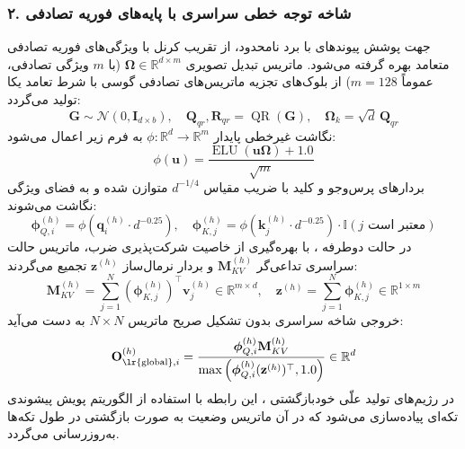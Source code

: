 \subsubsection*{۲. شاخه توجه خطی سراسری با پایه‌های فوریه تصادفی }
جهت پوشش پیوندهای با برد نامحدود، از تقریب کرنل با ویژگی‌های فوریه تصادفی متعامد  بهره گرفته می‌شود. ماتریس تبدیل تصویری $\boldsymbol{\Omega} \in \mathbb{R}^{d \times m}$ (با $m$ ویژگی تصادفی، عموماً $m=128$) از بلوک‌های تجزیه  ماتریس‌های تصادفی گوسی با شرط تعامد یکا تولید می‌گردد:
\begin{equation}
\mathbf{G} \sim \mathcal{N}(0, \mathbf{I}_{d \times b}), \quad \mathbf{Q}_{qr}, \mathbf{R}_{qr} = \operatorname{QR}(\mathbf{G}), \quad \boldsymbol{\Omega}_k = \sqrt{d} \, \mathbf{Q}_{qr}
\end{equation}
نگاشت غیرخطی پایدار $\phi: \mathbb{R}^d \to \mathbb{R}^m$ به فرم زیر اعمال می‌شود:
\begin{equation}
\phi(\mathbf{u}) = \frac{\operatorname{ELU}(\mathbf{u}\boldsymbol{\Omega}) + 1.0}{\sqrt{m}}
\end{equation}
بردارهای پرس‌وجو و کلید با ضریب مقیاس $d^{-1/4}$ متوازن شده و به فضای ویژگی نگاشت می‌شوند:
\begin{equation}
\boldsymbol{\phi}_{Q, i}^{(h)} = \phi(\mathbf{q}_i^{(h)} \cdot d^{-0.25}), \quad \boldsymbol{\phi}_{K, j}^{(h)} = \phi(\mathbf{k}_j^{(h)} \cdot d^{-0.25}) \cdot \mathbb{I}(j \text{ معتبر است})
\end{equation}
در حالت دوطرفه ، با بهره‌گیری از خاصیت شرکت‌پذیری ضرب، ماتریس حالت سراسری تداعی‌گر $\mathbf{M}_{KV}^{(h)}$ و بردار نرمال‌ساز $\mathbf{z}^{(h)}$ تجمیع می‌گردند:
\begin{equation}
\mathbf{M}_{KV}^{(h)} = \sum_{j=1}^N (\boldsymbol{\phi}_{K, j}^{(h)})^\top \mathbf{v}_j^{(h)} \in \mathbb{R}^{m \times d}, \quad \mathbf{z}^{(h)} = \sum_{j=1}^N \boldsymbol{\phi}_{K, j}^{(h)} \in \mathbb{R}^{1 \times m}
\end{equation}
خروجی شاخه سراسری بدون تشکیل صریح ماتریس $N \times N$ به دست می‌آید:
\begin{equation}
\mathbf{O}_{\text{\lr{global}}, i}^{(h)} = \frac{\boldsymbol{\phi}_{Q, i}^{(h)} \mathbf{M}_{KV}^{(h)}}{\max\left( \boldsymbol{\phi}_{Q, i}^{(h)} (\mathbf{z}^{(h)})^\top, 1.0 \right)} \in \mathbb{R}^d
\end{equation}
در رژیم‌های تولید علّی خودبازگشتی ، این رابطه با استفاده از الگوریتم پویش پیشوندی تکه‌ای  پیاده‌سازی می‌شود که در آن ماتریس وضعیت به صورت بازگشتی در طول تکه‌ها به‌روزرسانی می‌گردد.

